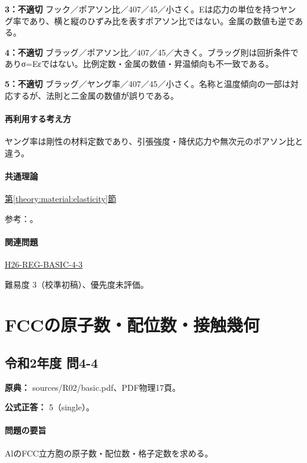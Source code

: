 \noindent\textbf{3：不適切} フック／ポアソン比／407／45／小さく。Eは応力の単位を持つヤング率であり、横と縦のひずみ比を表すポアソン比ではない。金属の数値も逆である。\par

\noindent\textbf{4：不適切} ブラッグ／ポアソン比／407／45／大きく。ブラッグ則は回折条件でありσ=Eεではない。比例定数・金属の数値・昇温傾向も不一致である。\par

\noindent\textbf{5：不適切} ブラッグ／ヤング率／407／45／小さく。名称と温度傾向の一部は対応するが、法則と二金属の数値が誤りである。\par

\paragraph{再利用する考え方} ヤング率は剛性の材料定数であり、引張強度・降伏応力や無次元のポアソン比と違う。

\paragraph{共通理論} \hyperref[theory:material:elasticity]{第\ref*{theory:material:elasticity}節}

\par 参考：\cite{mit_material_elastic2000,princeton_magnesium,princeton_tungsten}。

\paragraph{関連問題} \hyperref[q:h26-reg-basic-4-3]{H26-REG-BASIC-4-3}

\par 難易度 3（校準初稿）、優先度未評価。

\section{FCCの原子数・配位数・接触幾何}

\subsection{令和2年度 問4-4}
\label{q:r02-reg-basic-4-4}

\noindent\textbf{原典：} sources/R02/basic.pdf、PDF物理17頁。

\textbf{公式正答：} 5（single）。

\paragraph{問題の要旨} AlのFCC立方胞の原子数・配位数・格子定数を求める。

